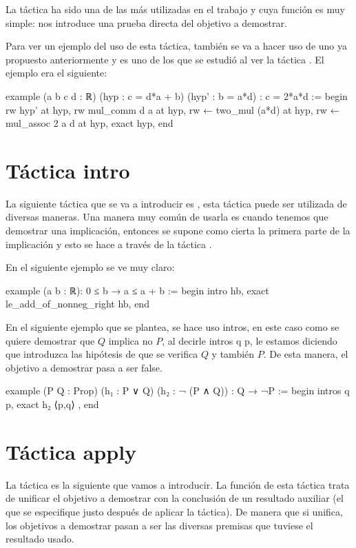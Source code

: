 La táctica  ha sido una de las más utilizadas en
el trabajo y cuya función es muy simple: nos introduce una prueba
directa del objetivo a demostrar.

Para ver un ejemplo del uso de esta táctica, también se va a hacer uso de uno
ya propuesto anteriormente y es uno de los que se estudió al ver la táctica
. El ejemplo era el siguiente:

\begin{leancode}
example (a b c d : ℝ) (hyp : c = d*a + b) (hyp' : b = a*d) : c = 2*a*d :=
begin
  rw hyp' at hyp,
  rw mul_comm d a at hyp,
  rw ← two_mul (a*d) at hyp,
  rw ← mul_assoc 2 a d at hyp,
  exact hyp,
end
\end{leancode}

\section{Táctica intro}

La siguiente táctica que se va a introducir es ,
esta táctica puede ser utilizada de diversas maneras. Una manera muy común de
usarla es cuando tenemos que demostrar una implicación, entonces se supone
como cierta la primera parte de la implicación y esto se hace a través de la
táctica .

En el siguiente ejemplo se ve muy claro:

\begin{leancode}
example (a b : ℝ): 0 ≤ b → a ≤ a + b :=
begin
  intro hb,
  exact le_add_of_nonneg_right hb,
end
\end{leancode}

En el siguiente ejemplo que se plantea, se hace uso intros, en este caso como
se quiere demostrar que \(Q\) implica no \(P\), al decirle intros q p, le
estamos diciendo que introduzca las hipótesis de que se verifica \(Q\) y
también \(P\). De esta manera, el objetivo a demostrar pasa a ser false.
\begin{leancode}
example (P Q : Prop) (h₁ : P ∨ Q) (h₂ : ¬ (P ∧ Q)) : Q → ¬P :=
begin
  intros q p,
  exact h₂ ⟨p,q⟩ ,
end
\end{leancode}

\section{Táctica apply}

La táctica  es la siguiente que vamos a introducir. La
función de esta táctica trata de unificar el objetivo a demostrar con la
conclusión de un resultado auxiliar (el que se especifique justo después de
aplicar la táctica). De manera que si unifica, los objetivos a demostrar pasan
a ser las diversas premisas que tuviese el resultado usado.

